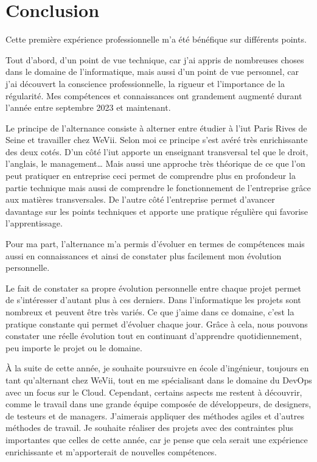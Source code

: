 \chapter*{Conclusion}
\begin{center}
    Cette première expérience professionnelle m’a été bénéfique sur différents points.

    \bigskip

    Tout d’abord, d’un point de vue technique, car j’ai appris de nombreuses choses dans le domaine de l’informatique, mais aussi d’un point de vue personnel, car j’ai découvert la conscience professionnelle, la rigueur et l’importance de la régularité.
    Mes compétences et connaissances ont grandement augmenté durant l’année entre septembre 2023 et maintenant.

    \bigskip

    Le principe de l’alternance consiste à alterner entre étudier à l’iut Paris Rives de Seine et travailler chez WeVii.
    Selon moi ce principe s’est avéré très enrichissante des deux cotés.
    D’un côté l’iut apporte un enseignant transversal tel que le droit, l’anglais, le management… Mais aussi une approche très théorique de ce que l’on peut pratiquer en entreprise ceci permet de comprendre plus en profondeur la partie technique mais aussi de comprendre le fonctionnement de l’entreprise grâce aux matières transversales.
    De l’autre côté l’entreprise permet d’avancer davantage sur les points techniques et apporte une pratique régulière qui favorise l’apprentissage.

    \bigskip

    Pour ma part, l’alternance m’a permis d’évoluer en termes de compétences mais aussi en connaissances et ainsi de constater plus facilement mon évolution personnelle.

    \bigskip

    Le fait de constater sa propre évolution personnelle entre chaque projet permet de s’intéresser d’autant plus à ces derniers.
    Dans l’informatique les projets sont nombreux et peuvent être très variés.
    Ce que j’aime dans ce domaine, c’est la pratique constante qui permet d’évoluer chaque jour.
    Grâce à cela, nous pouvons constater une réelle évolution tout en continuant d’apprendre quotidiennement, peu importe le projet ou le domaine.

    \bigskip

    À la suite de cette année, je souhaite poursuivre en école d'ingénieur, toujours en tant qu'alternant chez WeVii, tout en me spécialisant dans le domaine du DevOps avec un focus sur le Cloud.
    Cependant, certains aspects me restent à découvrir, comme le travail dans une grande équipe composée de développeurs, de designers, de testeurs et de managers.
    J'aimerais appliquer des méthodes agiles et d'autres méthodes de travail.
    Je souhaite réaliser des projets avec des contraintes plus importantes que celles de cette année, car je pense que cela serait une expérience enrichissante et m'apporterait de nouvelles compétences.


\end{center}
